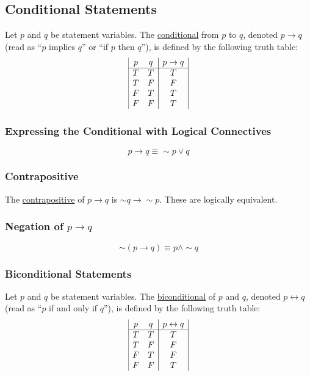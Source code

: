 \subsection{Conditional Statements}
\begin{definition}
    Let $p$ and $q$ be statement variables. The \underline{conditional} from $p$ to $q$, denoted $p\rightarrow q$ (read as ``$p$ implies $q$'' or ``if $p$ then $q$''), is defined by the following truth table:
    $$\begin{array}{|c c|c|}
    p & q & p\rightarrow q\\
    \hline
    T & T & T\\
    T & F & F\\
    F & T & T\\
    F & F & T
    \end{array}$$
\end{definition}

\subsubsection{Expressing the Conditional with Logical Connectives}
$$p\rightarrow q \equiv \sim p \lor q$$

\subsubsection{Contrapositive}
\begin{definition}
    The \underline{contrapositive} of $p\rightarrow q$ is $\sim q \rightarrow \sim p$. These are logically equivalent.
\end{definition}

\subsubsection{Negation of $p\rightarrow q$}
$$\sim\left(p\rightarrow q\right) \equiv p\land \sim q$$

\subsubsection{Biconditional Statements}
\begin{definition}
    Let $p$ and $q$ be statement variables. The \underline{biconditional} of $p$ and $q$, denoted $p\leftrightarrow q$ (read as ``$p$ if and only if $q$''), is defined by the following truth table:
    $$\begin{array}{|c c|c|}
    p & q & p\leftrightarrow q\\
    \hline
    T & T & T\\
    T & F & F\\
    F & T & F\\
    F & F & T
    \end{array}$$
\end{definition}


